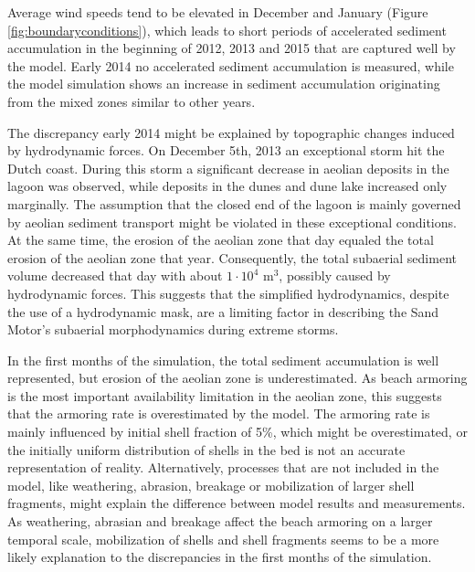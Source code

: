 Average wind speeds tend to be elevated in December and January
(Figure \ref{fig:boundaryconditions}), which leads to short periods of
accelerated sediment accumulation in the beginning of 2012, 2013 and
2015 that are captured well by the model. Early 2014 no accelerated
sediment accumulation is measured, while the model simulation shows an
increase in sediment accumulation originating from the mixed zones
similar to other years.

The discrepancy early 2014 might be explained by topographic changes
induced by hydrodynamic forces. On December 5th, 2013 an exceptional
storm hit the Dutch coast. During this storm a significant decrease in
aeolian deposits in the lagoon was observed, while deposits in the
dunes and dune lake increased only marginally. The assumption that the
closed end of the lagoon is mainly governed by aeolian sediment
transport might be violated in these exceptional conditions. At the
same time, the erosion of the aeolian zone that day equaled the total
erosion of the aeolian zone that year. Consequently, the total
subaerial sediment volume decreased that day with about $\mathrm{1
  \cdot 10^4}$ $\mathrm{m^3}$, possibly caused by hydrodynamic
forces. This suggests that the simplified hydrodynamics, despite the
use of a hydrodynamic mask, are a limiting factor in describing the
Sand Motor's subaerial morphodynamics during extreme storms.

In the first months of the simulation, the total sediment accumulation
is well represented, but erosion of the aeolian zone is
underestimated. As beach armoring is the most important availability
limitation in the aeolian zone, this suggests that the armoring rate
is overestimated by the model. The armoring rate is mainly influenced
by initial shell fraction of 5\%, which might be overestimated, or the
initially uniform distribution of shells in the bed is not an accurate
representation of reality. Alternatively, processes that are not
included in the model, like weathering, abrasion, breakage or
mobilization of larger shell fragments, might explain the difference
between model results and measurements. As weathering, abrasian and
breakage affect the beach armoring on a larger temporal scale,
mobilization of shells and shell fragments seems to be a more likely
explanation to the discrepancies in the first months of the
simulation.

